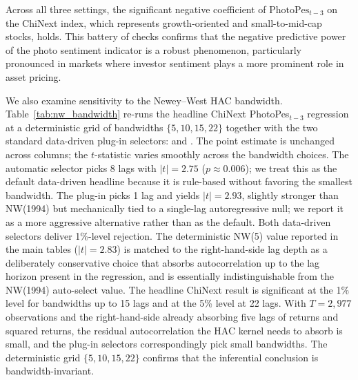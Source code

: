 \documentclass[AER]{AEA}
\begin{document}
Across all three settings, the significant negative coefficient of $\text{PhotoPes}_{t-3}$ on the ChiNext index, which represents growth-oriented and small-to-mid-cap stocks, holds. This battery of checks confirms that the negative predictive power of the photo sentiment indicator is a robust phenomenon, particularly pronounced in markets where investor sentiment plays a more prominent role in asset pricing.

We also examine sensitivity to the Newey--West HAC bandwidth. Table~\ref{tab:nw_bandwidth} re-runs the headline ChiNext PhotoPes$_{t-3}$ regression at a deterministic grid of bandwidths $\{5, 10, 15, 22\}$ together with the two standard data-driven plug-in selectors: \citet{andrews1991heteroskedasticity} and \citet{newey1994automatic}. The point estimate is unchanged across columns; the $t$-statistic varies smoothly across the bandwidth choices. The \citet{newey1994automatic} automatic selector picks 8 lags with $|t|=2.75$ ($p \approx 0.006$); we treat this as the default data-driven headline because it is rule-based without favoring the smallest bandwidth. The \citet{andrews1991heteroskedasticity} plug-in picks 1 lag and yields $|t|=2.93$, slightly stronger than NW(1994) but mechanically tied to a single-lag autoregressive null; we report it as a more aggressive alternative rather than as the default. Both data-driven selectors deliver 1\%-level rejection. The deterministic NW(5) value reported in the main tables ($|t|=2.83$) is matched to the right-hand-side lag depth as a deliberately conservative choice that absorbs autocorrelation up to the lag horizon present in the regression, and is essentially indistinguishable from the NW(1994) auto-select value. The headline ChiNext result is significant at the 1\% level for bandwidths up to 15 lags and at the 5\% level at 22 lags. With $T=2{,}977$ observations and the right-hand-side already absorbing five lags of returns and squared returns, the residual autocorrelation the HAC kernel needs to absorb is small, and the plug-in selectors correspondingly pick small bandwidths. The deterministic grid $\{5, 10, 15, 22\}$ confirms that the inferential conclusion is bandwidth-invariant.
\end{document}
